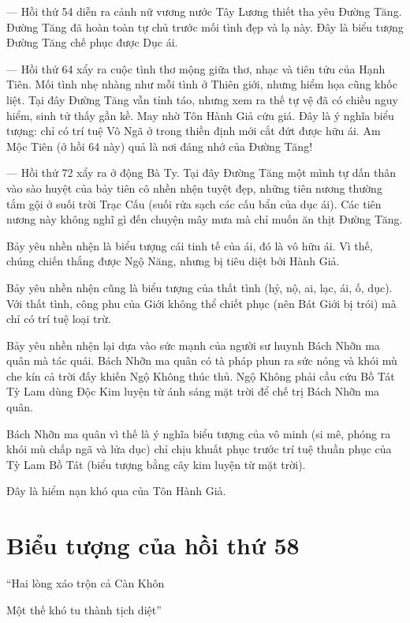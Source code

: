 — Hồi thứ 54 diễn ra cảnh nữ vương nước Tây Lương thiết tha yêu Đường Tăng. Đường Tăng đã hoàn toàn tự chủ trước mối tình đẹp và lạ này. Đây là biểu tượng Đường Tăng chế phục được Dục ái.

— Hồi thứ 64 xẩy ra cuộc tình thơ mộng giữa thơ, nhạc và tiên tửu của Hạnh Tiên. Mối tình nhẹ nhàng như mỗi tình ở Thiên giới, nhưng hiểm họa cũng khốc liệt. Tại đây Đường Tăng vẫn tỉnh táo, nhưng xem ra thế tự vệ đã có chiều nguy hiểm, sinh tử thấy gần kề. May nhờ Tôn Hành Giả cứu giá. Đây là ý nghĩa biểu tượng: chỉ có trí tuệ Vô Ngã ở trong thiền định mới cắt đứt được hữu ái. Am Mộc Tiên (ở hồi 64 này) quả là nơi đáng nhớ của Đường Tăng!

— Hồi thứ 72 xẩy ra ở động Bà Ty. Tại đây Đường Tăng một mình tự dấn thân vào sào huyệt của bảy tiên cô nhền nhện tuyệt đẹp, những tiên nương thường tắm gội ở suối trời Trạc Cấu (suối rửa sạch các cấu bẩn của dục ái). Các tiên nương này không nghĩ gì đến chuyện mây mưa mà chỉ muốn ăn thịt Đường Tăng.

Bảy yêu nhền nhện là biểu tượng cái tinh tế của ái, đó là vô hữu ái. Vì thế, chúng chiến thắng được Ngộ Năng, nhưng bị tiêu diệt bởi Hành Giả.

Bảy yêu nhền nhện cũng là biểu tượng của thất tình (hỷ, nộ, ai, lạc, ái, ố, dục). Với thất tình, công phu của Giới không thể chiết phục (nên Bát Giới bị trói) mà chỉ có trí tuệ loại trừ.

Bảy yêu nhền nhện lại dựa vào sức mạnh của người sư huynh Bách Nhỡn ma quân mà tác quái. Bách Nhỡn ma quân có tà pháp phun ra sức nóng và khói mù che kín cả trời đấy khiến Ngộ Không thúc thủ. Ngộ Không phải cầu cứu Bồ Tát Tỳ Lam dùng Độc Kim luyện từ ánh sáng mặt trời để chế trị Bách Nhỡn ma quân.

Bách Nhỡn ma quân vì thế là ý nghĩa biểu tượng của vô minh (si mê, phóng ra khói mù chấp ngã và lửa dục) chỉ chịu khuất phục trước trí tuệ thuần phục của Tỳ Lam Bồ Tát (biểu tượng bằng cây kim luyện từ mặt trời).

Đây là hiểm nạn khó qua của Tôn Hành Giả.

\section{Biểu tượng của hồi thứ 58} %
\label{sec:bieu_tuong_hoi_58}

\begin{itshape}
``Hai lòng xáo trộn cả Càn Khôn

Một thế khó tu thành tịch diệt''
\end{itshape}

